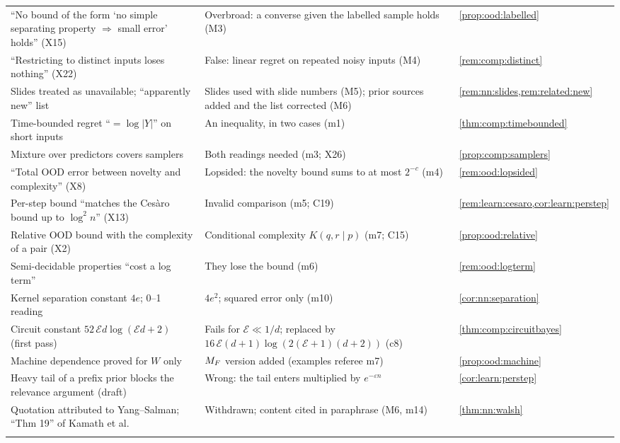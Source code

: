 {\begin{longtable}{@{}>{\raggedright\arraybackslash}p{5.1cm}>{\raggedright\arraybackslash}p{7.6cm}>{\raggedright\arraybackslash}p{2.6cm}@{}}
``No bound of the form `no simple separating property $\Rightarrow$ small error' holds'' (X15) & Overbroad: a converse given the labelled sample holds (M3) & \cref{prop:ood:labelled}\\
``Restricting to distinct inputs loses nothing'' (X22) & False: linear regret on repeated noisy inputs (M4) & \cref{rem:comp:distinct}\\
Slides treated as unavailable; ``apparently new'' list & Slides used with slide numbers (M5); prior sources added and the list corrected (M6) & \cref{rem:nn:slides,rem:related:new}\\
Time-bounded regret ``$=\log|Y|$'' on short inputs & An inequality, in two cases (m1) & \cref{thm:comp:timebounded}\\
Mixture over predictors covers samplers & Both readings needed (m3; X26) & \cref{prop:comp:samplers}\\
``Total OOD error between novelty and complexity'' (X8) & Lopsided: the novelty bound sums to at most $2^{-c}$ (m4) & \cref{rem:ood:lopsided}\\
Per-step bound ``matches the Ces\`aro bound up to $\log^2n$'' (X13) & Invalid comparison (m5; C19) & \cref{rem:learn:cesaro,cor:learn:perstep}\\
Relative OOD bound with the complexity of a pair (X2) & Conditional complexity $K(q,r\mid p)$ (m7; C15) & \cref{prop:ood:relative}\\
Semi-decidable properties ``cost a log term'' & They lose the bound (m6) & \cref{rem:ood:logterm}\\
Kernel separation constant $4e$; 0--1 reading & $4e^2$; squared error only (m10) & \cref{cor:nn:separation}\\
Circuit constant $52\,\mathcal Ed\log(\mathcal Ed+2)$ (first pass) & Fails for $\mathcal E\ll1/d$; replaced by $16\,\mathcal E(d+1)\log(2(\mathcal E+1)(d+2))$ (c8) & \cref{thm:comp:circuitbayes}\\
Machine dependence proved for $W$ only & $M_{F}$ version added (examples referee m7) & \cref{prop:ood:machine}\\
Heavy tail of a prefix prior blocks the relevance argument (draft) & Wrong: the tail enters multiplied by $e^{-\varepsilon n}$ & \cref{cor:learn:perstep}\\
Quotation attributed to Yang--Salman; ``Thm 19'' of Kamath et al. & Withdrawn; content cited in paraphrase (M6, m14) & \cref{thm:nn:walsh}\\
\multicolumn{3}{@{}l}{\emph{Made while writing this paper}}\\

\end{longtable}}
